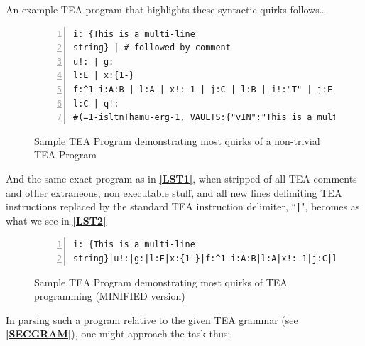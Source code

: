 \documentclass[a4paper, 18pt]{book} %
\begin{document}
An example TEA program that highlights these syntactic quirks follows…

  \begin{figure}[H]
  \centering
  \begin{tcolorbox}[teaterminalstyle, title=TEA Program]
  \begin{lstlisting}[language=TEA, caption={TP 1}, label={LST1}, numbers=left]
i: {This is a multi-line
string} | # followed by comment
u!: | g:
l:E | x:{1-}
f:^1-i:A:B | l:A | x!:-1 | j:C | l:B | i!:"T" | j:E
l:C | q!:
#(=1-isltnThamu-erg-1, VAULTS:{"vIN":"This is a multi-line\nstring"})
  \end{lstlisting}
  \end{tcolorbox}
  \caption{Sample TEA Program demonstrating most quirks of a non-trivial TEA Program}
  \label{FIG7}
\end{figure}

And the same exact program as in  \textbf{\autoref{LST1}}, when stripped of all TEA comments and other extraneous, non executable stuff, and all new lines delimiting TEA instructions replaced by the standard TEA instruction delimiter, ``\texttt{|}", becomes as what we see in \textbf{\autoref{LST2}}

 \begin{figure}[H]
  \centering
  \begin{tcolorbox}[teaterminalstyle, title=TEA Program]
  \begin{lstlisting}[language=TEA, caption={TP 2}, label={LST2}, numbers=left]
i: {This is a multi-line
string}|u!:|g:|l:E|x:{1-}|f:^1-i:A:B|l:A|x!:-1|j:C|l:B|i!:"T"|j:E|l:C|q!:
  \end{lstlisting}
  \end{tcolorbox}
  \caption{Sample TEA Program demonstrating most quirks of TEA programming (MINIFIED version)}
  \label{FIG8}
\end{figure}

In parsing such a program relative to the given TEA grammar (see \textbf{\autoref{SECGRAM}}), one might approach the task thus:
\end{document}
